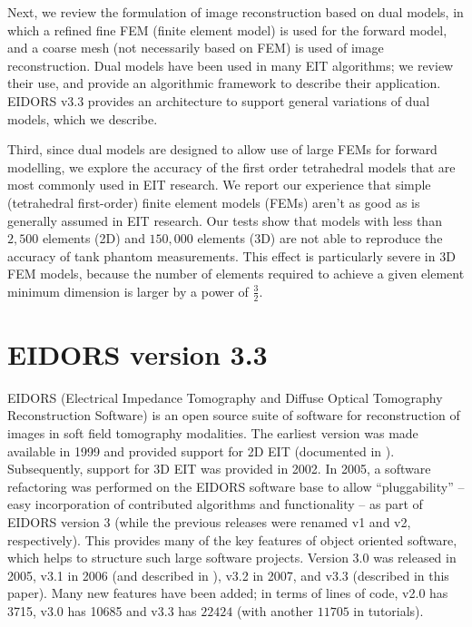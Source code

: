 \documentclass[letterpaper,twocolumn,10pt]{article}
\begin{document}
Next, we review the formulation of image reconstruction based
on dual models, in which a refined fine FEM (finite element
model) is used for the forward model, and a
coarse mesh (not necessarily based on FEM) is used of image
reconstruction. Dual models have been used in many EIT algorithms;
we review their use, and provide an algorithmic framework
to describe their application. EIDORS v3.3 provides an
architecture to support general variations of dual models,
which we describe.

Third,
since dual models are designed to allow use of large
FEMs for forward modelling, we explore the accuracy of the
first order tetrahedral models that are most commonly used
in EIT research.
We report our experience that
   simple (tetrahedral first-order) finite element models (FEMs)
      aren't as good as is generally assumed in EIT research.
Our tests show that models with less than $2,500$ elements (2D) and
$150,000$ elements (3D) are not able to reproduce the accuracy of
tank phantom measurements.
This effect is particularly severe in 3D FEM models, because
the number of elements required to achieve a given element
minimum dimension is larger by a power of $\frac{3}{2}$.
 

\section{EIDORS version 3.3}

EIDORS (Electrical Impedance Tomography and Diffuse Optical
 Tomography Reconstruction Software) is an open source
suite of software for reconstruction of images in soft 
field tomography modalities. The earliest
 version\cite{lionheart1999} was made available in 1999
and provided support for 2D EIT (documented in
\cite{vauhkonen2001}).
Subsequently, support for 3D EIT was provided\cite{polydorides2002} in 
2002. In 2005, a software refactoring was performed on the
EIDORS software base to allow ``pluggability''
-- easy incorporation of contributed algorithms and 
functionality -- as part of EIDORS version 3 (while the
previous releases were renamed v1 and v2, respectively). 
This provides many of the key features of object oriented
software, which helps to structure such large software projects.
Version 3.0 was released in 2005\cite{adler2005},
 v3.1 in 2006 (and described
in \cite{adler2006}), v3.2 in 2007, and v3.3
(described in this paper). Many new features have been added;
in terms of lines of code, v2.0 has 3715, v3.0 has 10685
and v3.3 has $22424$ (with another $11705$ in tutorials).
\end{document}
